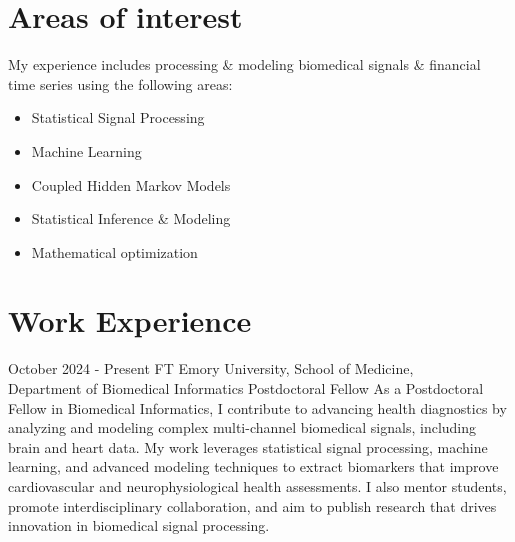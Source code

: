 \documentclass[
	10pt, %
]{FreemanCV}
\begin{document}
\begin{paracol}{2}
\section{Areas of interest}

My experience includes processing \& modeling biomedical signals \& financial time series using the following areas:

\begin{itemize}

\item  Statistical Signal Processing

\item Machine Learning
   
\item Coupled Hidden Markov Models

\item Statistical Inference \& Modeling

\item Mathematical optimization

\end{itemize}



\section{Work Experience}





\jobentry
	{October 2024 - Present} %
	{FT} %
	{Emory University, School of Medicine, \\ Department of Biomedical Informatics} %
	{Postdoctoral Fellow}%
	{As a Postdoctoral Fellow in Biomedical Informatics, I contribute to advancing health diagnostics by analyzing and modeling complex multi-channel biomedical signals, including brain and heart data. My work leverages statistical signal processing, machine learning, and advanced modeling techniques to extract biomarkers that improve cardiovascular and neurophysiological health assessments. I also mentor students, promote interdisciplinary collaboration, and aim to publish research that drives innovation in biomedical signal processing.} %


\end{paracol}
\end{document}

